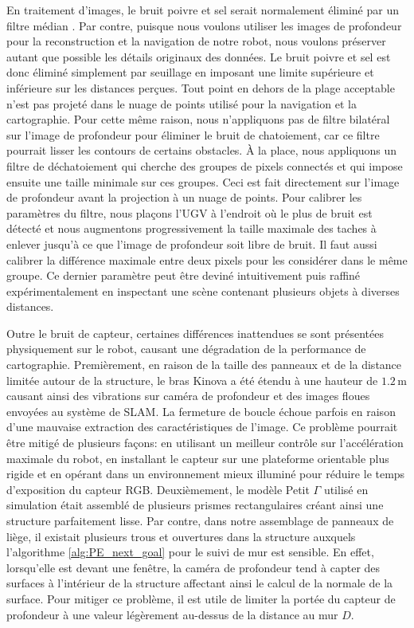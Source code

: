 En traitement d'images, le bruit poivre et sel serait normalement éliminé par un filtre médian \citep{jayaraman2009digital}. Par contre, puisque nous voulons utiliser les images de profondeur pour la reconstruction et la navigation de notre robot, nous voulons préserver autant que possible les détails originaux des données. Le bruit poivre et sel est donc éliminé simplement par seuillage en imposant une limite supérieure et inférieure sur les distances perçues. Tout point en dehors de la plage acceptable n'est pas projeté dans le nuage de points utilisé pour la navigation et la cartographie. Pour cette même raison, nous n'appliquons pas de filtre bilatéral sur l'image de profondeur pour éliminer le bruit de chatoiement, car ce filtre pourrait lisser les contours de certains obstacles. À la place, nous appliquons un filtre de déchatoiement qui cherche des groupes de pixels connectés et qui impose ensuite une taille minimale sur ces groupes. Ceci est fait directement sur l'image de profondeur avant la projection à un nuage de points. Pour calibrer les paramètres du filtre, nous plaçons l'UGV à l'endroit où le plus de bruit est détecté et nous augmentons progressivement la taille maximale des taches à enlever jusqu'à ce que l'image de profondeur soit libre de bruit. Il faut aussi calibrer la différence maximale entre deux pixels pour les considérer dans le même groupe. Ce dernier paramètre peut être deviné intuitivement puis raffiné expérimentalement en inspectant une scène contenant plusieurs objets à diverses distances.

Outre le bruit de capteur, certaines différences inattendues se sont présentées physiquement sur le robot, causant une dégradation de la performance de cartographie. Premièrement, en raison de la taille des panneaux et de la distance limitée autour de la structure, le bras Kinova a été étendu à une hauteur de $1.2\, \mathrm{m}$ causant ainsi des vibrations sur caméra de profondeur et des images floues envoyées au système de SLAM. La fermeture de boucle échoue parfois en raison d'une mauvaise extraction des caractéristiques de l'image. Ce problème pourrait être mitigé de plusieurs façons: en utilisant un meilleur contrôle sur l'accélération maximale du robot, en installant le capteur sur une plateforme orientable plus rigide et en opérant dans un environnement mieux illuminé pour réduire le temps d'exposition du capteur RGB. Deuxièmement, le modèle Petit $\Gamma$ utilisé en simulation était assemblé de plusieurs prismes rectangulaires créant ainsi une structure parfaitement lisse. Par contre, dans notre assemblage de panneaux de liège, il existait plusieurs trous et ouvertures dans la structure auxquels l'algorithme \ref{alg:PE_next_goal} pour le suivi de mur est sensible. En effet, lorsqu'elle est devant une fenêtre, la caméra de profondeur tend à capter des surfaces à l'intérieur de la structure affectant ainsi le calcul de la normale de la surface. Pour mitiger ce problème, il est utile de limiter la portée du capteur de profondeur à une valeur légèrement au-dessus de la distance au mur $D$.

